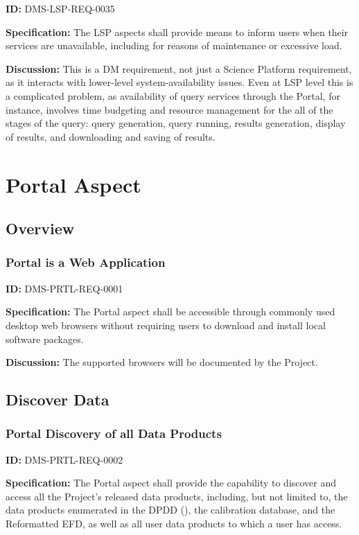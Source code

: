 \documentclass[SE,toc]{lsstdoc}
\begin{document}
\label{DMS-LSP-REQ-0035}
\textbf{ID:} DMS-LSP-REQ-0035

\textbf{Specification:}
The LSP aspects shall provide means to inform users when their services are unavailable, including for reasons of maintenance or excessive load.

\textbf{Discussion:}
This is a DM requirement, not just a Science Platform requirement, as it interacts with lower-level system-availability issues.
Even at LSP level this is a complicated problem, as availability of query services through the Portal, for instance, involves time budgeting and resource management for the all of the stages of the query: query generation, query running, results generation, display of results, and downloading and saving of results.

\section{Portal Aspect}

\subsection{Overview}

\subsubsection{Portal is a Web Application}

\label{DMS-PRTL-REQ-0001}
\textbf{ID:} DMS-PRTL-REQ-0001

\textbf{Specification:}
The Portal aspect shall be accessible through commonly used desktop web browsers without requiring users to download and install local software packages.

\textbf{Discussion:}
The supported browsers will be documented by the Project.

\subsection{Discover Data}

\subsubsection{Portal Discovery of all Data Products}

\label{DMS-PRTL-REQ-0002}
\textbf{ID:} DMS-PRTL-REQ-0002

\textbf{Specification:}
The Portal aspect shall provide the capability to discover and access all the Project's released data products, including, but not limited to, the data products enumerated in the DPDD (), the calibration database, and the Reformatted EFD, as well as all user data products to which a user has access.
\end{document}
